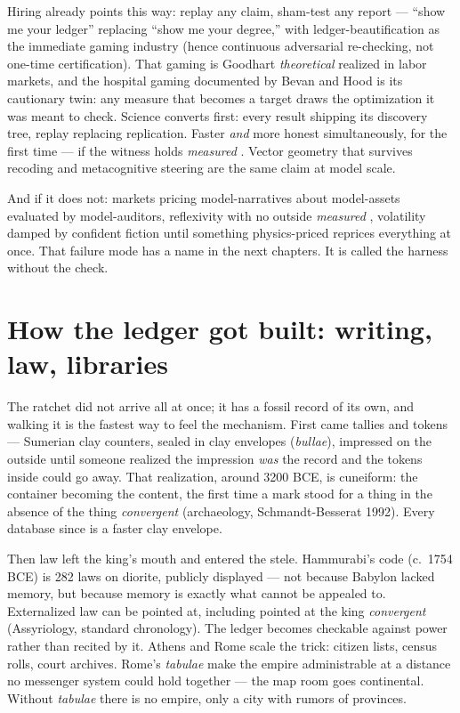 Hiring already points this way: replay any claim, sham-test any report --- ``show me your ledger'' replacing ``show me your degree,'' with ledger-beautification as the immediate gaming industry (hence continuous adversarial re-checking, not one-time certification). That gaming is Goodhart \textit{theoretical} \citep{goodhart2505,goodhart2410} realized in labor markets, and the hospital gaming documented by Bevan and Hood \citep{bevan2006} is its cautionary twin: any measure that becomes a target draws the optimization it was meant to check. Science converts first: every result shipping its discovery tree, replay replacing replication. Faster \textit{and} more honest simultaneously, for the first time --- if the witness holds \textit{measured} \citep{panickssery2024,shumailov2024}. Vector geometry that survives recoding \citep{jha2025} and metacognitive steering \citep{macar2026,cao2026} are the same claim at model scale.

And if it does not: markets pricing model-narratives about model-assets evaluated by model-auditors, reflexivity with no outside \textit{measured} \citep{soros}, volatility damped by confident fiction until something physics-priced reprices everything at once. That failure mode has a name in the next chapters. It is called the harness without the check.

\section{How the ledger got built: writing, law, libraries}

The ratchet did not arrive all at once; it has a fossil record of its own, and walking it is the fastest way to feel the mechanism. First came tallies and tokens --- Sumerian clay counters, sealed in clay envelopes (\textit{bullae}), impressed on the outside until someone realized the impression \textit{was} the record and the tokens inside could go away. That realization, around 3200 BCE, is cuneiform: the container becoming the content, the first time a mark stood for a thing in the absence of the thing \textit{convergent} (archaeology, Schmandt-Besserat 1992). Every database since is a faster clay envelope.

Then law left the king's mouth and entered the stele. Hammurabi's code (c.\ 1754 BCE) is 282 laws on diorite, publicly displayed --- not because Babylon lacked memory, but because memory is exactly what cannot be appealed to. Externalized law can be pointed at, including pointed at the king \textit{convergent} (Assyriology, standard chronology). The ledger becomes checkable against power rather than recited by it. Athens and Rome scale the trick: citizen lists, census rolls, court archives. Rome's \textit{tabulae} make the empire administrable at a distance no messenger system could hold together --- the map room goes continental. Without \textit{tabulae} there is no empire, only a city with rumors of provinces.

